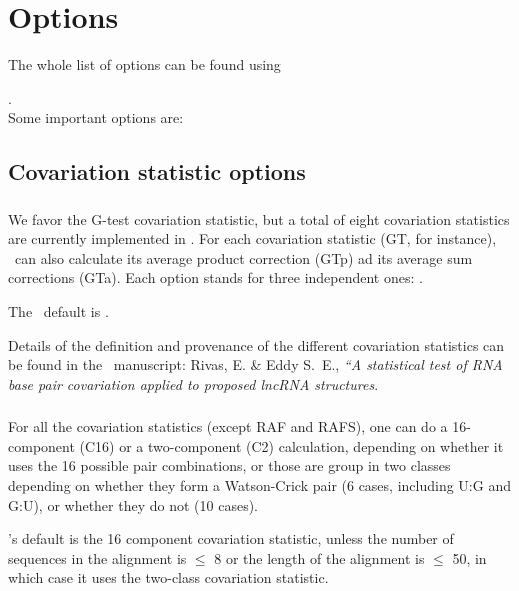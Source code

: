 
\section{Options}
\label{section:options}
\setcounter{footnote}{0}

The whole list of options can be found using 

.\\

Some important options are:
\subsection{Covariation statistic options}

\subsubsection{}

\subsubsection{}
We favor the G-test covariation statistic, but a total of eight
covariation statistics are currently implemented in \rscape. For each
covariation statistic (GT, for instance), \rscape\ can also calculate
its average product correction (GTp) ad its average sum corrections
(GTa).  Each option  stands for three independent ones:
.

The \rscape\ default is .

Details of the definition and provenance of the different covariation
statistics can be found in the \rscape\ manuscript: Rivas, E. \& Eddy
S.~E., \textit{``A statistical test of RNA base pair covariation
  applied to proposed lncRNA structures}.

\subsubsection{}
For all the covariation statistics (except RAF and RAFS), one can do a
16-component (C16) or a two-component (C2) calculation, depending on
whether it uses the 16 possible pair combinations, or those are group
in two classes depending on whether they form a Watson-Crick pair (6
cases, including U:G and G:U), or whether they do not (10 cases).

\rscape's default is the 16 component covariation statistic, unless
the number of sequences in the alignment is $\leq$ 8 or the length of
the alignment is $\leq$ 50, in which case it uses the two-class
covariation statistic.

